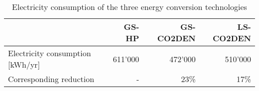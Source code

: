 \begin{table}[htp]
\centering
\caption{Electricity consumption of the three energy conversion technologies}\vspace{2mm}
\label{tab:V_el} 
\begin{tabular}{lrrr}
	\toprule
	& GS-HP & GS-CO2DEN & LS-CO2DEN \\ \midrule
	Electricity consumption [kWh/yr] & 611'000 & 472'000 & 510'000\\
	Corresponding reduction & - & 23\% &  17\% \\
	\bottomrule
\end{tabular}
\end{table}
